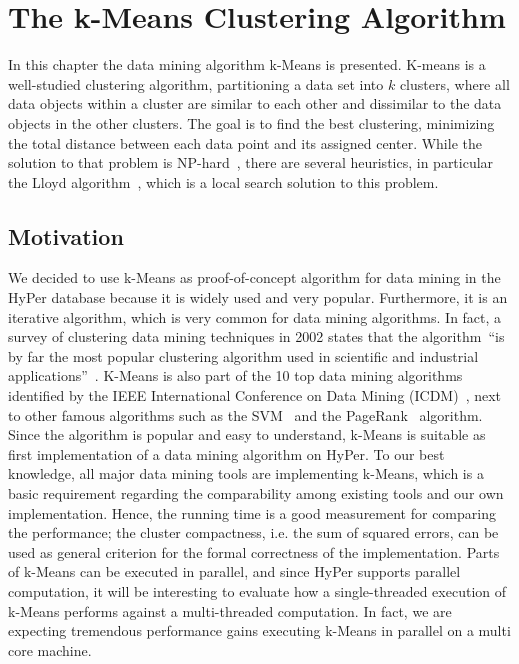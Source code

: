 \chapter{The k-Means Clustering Algorithm}\label{chapter:kmeans}

In this chapter the data mining algorithm k-Means is presented. K-means is a well-studied clustering algorithm, partitioning a data set into $k$ clusters, where all data objects within a cluster are similar to each other and dissimilar to the data objects in the other clusters. The goal is to find the best clustering, minimizing the total distance between each data point and its assigned center. While the solution to that problem is NP-hard~\parencite{nphard1}\parencite{nphard2}, there are several heuristics, in particular the Lloyd algorithm~\parencite{Lloyd82}, which is a local search solution to this problem.

\section{Motivation}
 
We decided to use k-Means as proof-of-concept algorithm for data mining in the HyPer database because it is widely used and very popular. Furthermore, it is an iterative algorithm, which is very common for data mining algorithms. In fact, a survey of clustering data mining techniques in 2002 states that the algorithm~\enquote{is by far the most popular clustering algorithm used in scientific and industrial applications}~\parencite{berkhin2002survey}. K-Means is also part of the 10 top data mining algorithms identified by the IEEE International Conference on Data Mining (ICDM)~\parencite{top10}, next to other famous algorithms such as the SVM~\parencite{svm} and the PageRank~\parencite{pagerank} algorithm.
\\
Since the algorithm is popular and easy to understand, k-Means is suitable as first implementation of a data mining algorithm on HyPer. To our best knowledge, all major data mining tools are implementing k-Means, which is a basic requirement regarding the comparability among existing tools and our own implementation. Hence, the running time is a good measurement for comparing the performance; the cluster compactness, i.e. the sum of squared errors, can be used as general criterion for the formal correctness of the implementation. 
Parts of k-Means can be executed in parallel, and since HyPer supports parallel computation, it will be interesting to evaluate how a single-threaded execution of k-Means performs against a multi-threaded computation. In fact, we are expecting tremendous performance gains executing k-Means in parallel on a multi core machine.

